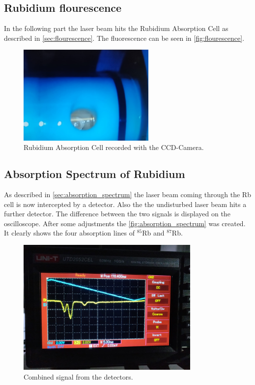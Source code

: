 \FloatBarrier

\subsection{Rubidium flourescence}
In the following part the laser beam hits the Rubidium Absorption Cell as described in \autoref{sec:flourescence}.
The fluorescence can be seen in \autoref{fig:flourescence}.
\begin{figure}
    \centering
    \includegraphics[width=0.6\textwidth]{content/data/flourescence_scaled.jpeg}
    \caption{Rubidium Absorption Cell recorded with the CCD-Camera.}
    \label{fig:flourescence}
\end{figure}
\FloatBarrier

\clearpage
\subsection{Absorption Spectrum of Rubidium}
As described in \autoref{sec:absorption_spectrum} the laser beam coming through the Rb cell is now intercepted by a detector.
Also the the undisturbed laser beam hits a further detector.
The difference between the two signals is displayed on the oscilloscope.
After some adjustments the \autoref{fig:absorption_spectrum} was created.
It clearly shows the four absorption lines of $^{85}$Rb and $^{87}$Rb.
\begin{figure}
    \centering
    \includegraphics[width=0.8\textwidth]{content/data/Absorption_spectrum.jpeg}
    \caption{Combined signal from the detectors.}
    \label{fig:absorption_spectrum}
\end{figure}